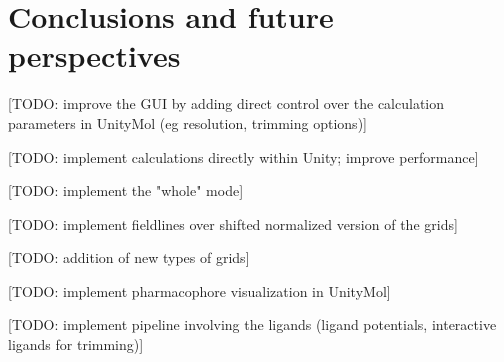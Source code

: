 \chapter{Conclusions and future perspectives} %

[TODO: improve the GUI by adding direct control over the calculation parameters in UnityMol (eg resolution, trimming options)]

[TODO: implement calculations directly within Unity; improve performance]

[TODO: implement the "whole" mode]

[TODO: implement fieldlines over shifted normalized version of the grids]

[TODO: addition of new types of grids]

[TODO: implement pharmacophore visualization in UnityMol]

[TODO: implement pipeline involving the ligands (ligand potentials, interactive ligands for trimming)]
